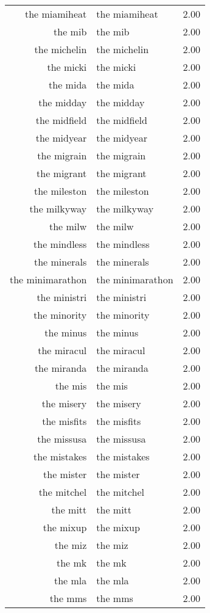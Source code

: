 \begin{table}[ht]
\begin{tabular}{rlr}
  the miamiheat & the miamiheat & 2.00 \\ 
  the mib & the mib & 2.00 \\ 
  the michelin & the michelin & 2.00 \\ 
  the micki & the micki & 2.00 \\ 
  the mida & the mida & 2.00 \\ 
  the midday & the midday & 2.00 \\ 
  the midfield & the midfield & 2.00 \\ 
  the midyear & the midyear & 2.00 \\ 
  the migrain & the migrain & 2.00 \\ 
  the migrant & the migrant & 2.00 \\ 
  the mileston & the mileston & 2.00 \\ 
  the milkyway & the milkyway & 2.00 \\ 
  the milw & the milw & 2.00 \\ 
  the mindless & the mindless & 2.00 \\ 
  the minerals & the minerals & 2.00 \\ 
  the minimarathon & the minimarathon & 2.00 \\ 
  the ministri & the ministri & 2.00 \\ 
  the minority & the minority & 2.00 \\ 
  the minus & the minus & 2.00 \\ 
  the miracul & the miracul & 2.00 \\ 
  the miranda & the miranda & 2.00 \\ 
  the mis & the mis & 2.00 \\ 
  the misery & the misery & 2.00 \\ 
  the misfits & the misfits & 2.00 \\ 
  the missusa & the missusa & 2.00 \\ 
  the mistakes & the mistakes & 2.00 \\ 
  the mister & the mister & 2.00 \\ 
  the mitchel & the mitchel & 2.00 \\ 
  the mitt & the mitt & 2.00 \\ 
  the mixup & the mixup & 2.00 \\ 
  the miz & the miz & 2.00 \\ 
  the mk & the mk & 2.00 \\ 
  the mla & the mla & 2.00 \\ 
  the mms & the mms & 2.00 \\ 

\end{tabular}
\end{table}
